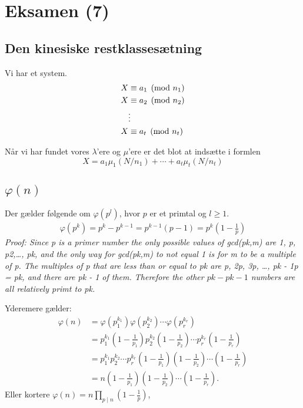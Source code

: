 \section{Eksamen (7)}
\subsection{Den kinesiske restklassesætning}
\label{Den kinesiske restklassesaetning}
Vi har et system.
\begin{align*}
  X &\equiv a_1 \pmod{n_1}\\
  X &\equiv a_2 \pmod{n_2}\\
  &\vdots\\
  X &\equiv a_t \pmod{n_t}
\end{align*}

Når vi har fundet vores $\lambda$'ere og $\mu$'ere er det blot at indsætte i
formlen
\begin{equation*}
  X = a_1 \mu_1 (N/n_1) + \cdots + a_t \mu_t (N/n_t)
\end{equation*}

\subsection{$\varphi(n)$}
Der gælder følgende om $\varphi(p^l)$, hvor $p$ er et primtal og $l \geq 1$.
\begin{align*}
  \varphi(p^k) = p^k -p^{k-1} =p^{k-1}(p-1) = p^k \left( 1 -
\frac{1}{p} \right)
\end{align*}
\textit{Proof: Since p is a primer number the only possible values of gcd(pk,m)
are 1, p, p2,\ldots, pk, and the only way for gcd(pk,m) to not equal 1 is for m
to be a multiple of p. The multiples of p that are less than or equal to pk are
p, 2p, 3p, \ldots, pk - 1p = pk, and there are pk - 1 of them. Therefore the
other $pk - pk - 1$ numbers are all relatively primt to pk.}

Yderemere gælder:
\begin{align*}
\varphi(n)
&= \varphi(p_1^{k_1}) \varphi(p_2^{k_2}) \cdots\varphi(p_r^{k_r})\\
&=  p_1^{k_1} \left(1- \frac{1}{p_1} \right) p_2^{k_2} \left(1- \frac{1}{p_2} \right) \cdots p_r^{k_r} \left(1- \frac{1}{p_r} \right)\\
&= p_1^{k_1} p_2^{k_2} \cdots p_r^{k_r} \left(1- \frac{1}{p_1} \right) \left(1- \frac{1}{p_2} \right) \cdots \left(1- \frac{1}{p_r} \right)\\
&=n \left(1- \frac{1}{p_1} \right)\left(1- \frac{1}{p_2} \right) \cdots\left(1- \frac{1}{p_r} \right).
\end{align*}
Eller kortere $\varphi(n) =n \prod_{p\mid n} \left(1-\frac{1}{p}\right)$,

